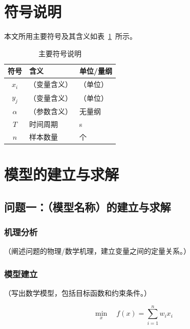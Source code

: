 \documentclass[12pt, a4paper]{article}
\begin{document}
\section{符号说明}

本文所用主要符号及其含义如表~\ref{tab:symbols}~所示。

\begin{table}[H]
\centering
\caption{主要符号说明}
\label{tab:symbols}
\begin{tabular}{cll}
\toprule
\textbf{符号} & \textbf{含义} & \textbf{单位/量纲} \\
\midrule
$x_i$  & （变量含义）     & （单位） \\
$y_j$  & （变量含义）     & （单位） \\
$\alpha$ & （参数含义）   & 无量纲 \\
$T$    & 时间周期         & s \\
$n$    & 样本数量         & 个 \\
\bottomrule
\end{tabular}
\end{table}

\section{模型的建立与求解}

\subsection{问题一：（模型名称）的建立与求解}

\subsubsection{机理分析}

（阐述问题的物理/数学机理，建立变量之间的定量关系。）

\subsubsection{模型建立}

（写出数学模型，包括目标函数和约束条件。）

\begin{equation}
    \min_{x} \quad f(x) = \sum_{i=1}^{n} w_i x_i
    \label{eq:obj1}
\end{equation}
\end{document}
